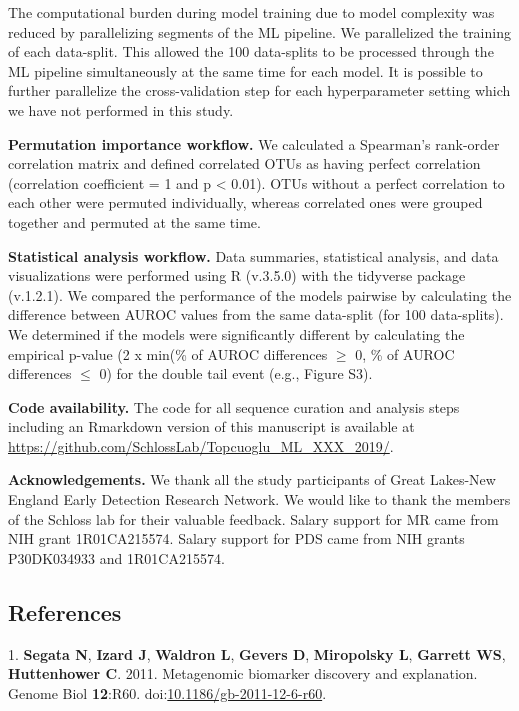 \documentclass[11pt,]{article}
\begin{document}
The computational burden during model training due to model complexity
was reduced by parallelizing segments of the ML pipeline. We
parallelized the training of each data-split. This allowed the 100
data-splits to be processed through the ML pipeline simultaneously at
the same time for each model. It is possible to further parallelize the
cross-validation step for each hyperparameter setting which we have not
performed in this study.

\textbf{Permutation importance workflow.} We calculated a Spearman's
rank-order correlation matrix and defined correlated OTUs as having
perfect correlation (correlation coefficient = 1 and p \textless{}
0.01). OTUs without a perfect correlation to each other were permuted
individually, whereas correlated ones were grouped together and permuted
at the same time.

\textbf{Statistical analysis workflow.} Data summaries, statistical
analysis, and data visualizations were performed using R (v.3.5.0) with
the tidyverse package (v.1.2.1). We compared the performance of the
models pairwise by calculating the difference between AUROC values from
the same data-split (for 100 data-splits). We determined if the models
were significantly different by calculating the empirical p-value (2 x
min(\% of AUROC differences \(\geq\) 0, \% of AUROC differences \(\leq\)
0) for the double tail event (e.g., Figure S3).

\textbf{Code availability.} The code for all sequence curation and
analysis steps including an Rmarkdown version of this manuscript is
available at \url{https://github.com/SchlossLab/Topcuoglu_ML_XXX_2019/}.

\textbf{Acknowledgements.} We thank all the study participants of Great
Lakes-New England Early Detection Research Network. We would like to
thank the members of the Schloss lab for their valuable feedback. Salary
support for MR came from NIH grant 1R01CA215574. Salary support for PDS
came from NIH grants P30DK034933 and 1R01CA215574.

\newpage

\subsection{References}\label{references}

\hypertarget{refs}{}
\hypertarget{ref-segata_metagenomic_2011}{}
1. \textbf{Segata N}, \textbf{Izard J}, \textbf{Waldron L},
\textbf{Gevers D}, \textbf{Miropolsky L}, \textbf{Garrett WS},
\textbf{Huttenhower C}. 2011. Metagenomic biomarker discovery and
explanation. Genome Biol \textbf{12}:R60.
doi:\href{https://doi.org/10.1186/gb-2011-12-6-r60}{10.1186/gb-2011-12-6-r60}.
\end{document}
